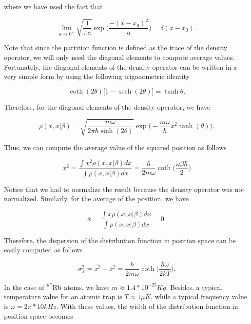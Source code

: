 \documentclass{article}
\DeclareMathOperator{\sech}{sech}
\begin{document}
where we have used the fact that

\begin{equation}
    \lim_{a \to 0^{+}} \sqrt{\frac{1}{\pi a}} \exp \bigg(\frac{-(x-x_{0})^{2}}{a} \bigg) = \delta(x-x_{0}).
\end{equation}

Note that since the partition function is defined as the trace of the density operator, we will only need the diagonal elements to compute average values. Fortunately, the diagonal elements of the density operator can be written in a very simple form by using the following trigonometric identity

\begin{equation}
    \coth (2\theta) \big[1-\sech(2\theta) \big] = \tanh\theta.
\end{equation}

Therefore, for the diagonal elements of the density operator, we have 

\begin{equation}
    \rho(x,x|\beta) = \sqrt{\frac{m\omega}{2\pi\hbar\sinh(2\theta)}} \exp \bigg( -\frac{m\omega}{\hbar}x^{2} \tanh(\theta) \bigg).
\end{equation}

Thus, we can compute the average value of the squared position as follows

\begin{equation}
    \overline{x^{2}} = \frac{\int x^{2} \rho(x,x|\beta) dx}{\int \rho(x,x|\beta) dx} = \frac{\hbar}{2m\omega} \coth\bigg( \frac{\omega\beta\hbar}{2} \bigg)
\end{equation}

Notice that we had to normalize the result because the density operator was not normalized. Similarly, for the average of the position, we have

\begin{equation}
    \overline{x} = \frac{\int x \rho(x,x|\beta) dx}{\int \rho(x,x|\beta) dx} = 0.
\end{equation}

Therefore, the dispersion of the distribution function in position space can be easily computed as follows

\begin{equation}\label{dispersion_harmonic_oscillator}
    \sigma_{x}^{2} = \overline{x^{2}} - \overline{x}^{2} = \frac{\hbar}{2m\omega} \coth \bigg( \frac{\hbar\omega}{2kT} \bigg).
\end{equation}

In the case of $\ce{^{87}_{}Rb}$ atoms, we have $m\approx1.4*10^{-25} Kg$. Besides, a typical temperature value for an atomic trap is $T\approx 1 \mu K$, while a typical frequency value is $\omega = 2\pi *10 kHz$. With these values, the width of the distribution function in position space becomes
\end{document}
